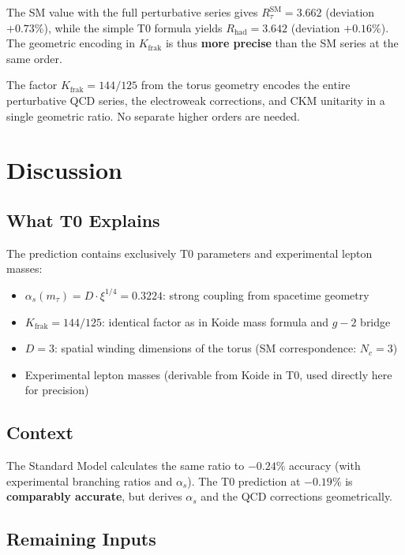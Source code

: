 	The SM value with the full perturbative series gives $R_\tau^\text{SM} = 3.662$ (deviation $+0.73\%$), while the simple T0 formula yields $R_\text{had} = 3.642$ (deviation $+0.16\%$). The geometric encoding in $K_\text{frak}$ is thus \textbf{more precise} than the SM series at the same order.
	
	\begin{keypoint}
		The factor $K_\text{frak} = 144/125$ from the torus geometry encodes the entire perturbative QCD series, the electroweak corrections, and CKM unitarity in a single geometric ratio. No separate higher orders are needed.
	\end{keypoint}
	
	
	\section{Discussion}
	
	\subsection{What T0 Explains}
	
	The prediction contains exclusively T0 parameters and experimental lepton masses:
	\begin{itemize}
		\item $\alpha_s(m_\tau) = D \cdot \xi^{1/4} = 0.3224$: strong coupling from spacetime geometry
		\item $K_\text{frak} = 144/125$: identical factor as in Koide mass formula and $g-2$ bridge
		\item $D = 3$: spatial winding dimensions of the torus (SM correspondence: $N_c=3$)
		\item Experimental lepton masses (derivable from Koide in T0, used directly here for precision)
	\end{itemize}
	
	\subsection{Context}
	
	The Standard Model calculates the same ratio to $-0.24\%$ accuracy (with experimental branching ratios and $\alpha_s$). The T0 prediction at $-0.19\%$ is \textbf{comparably accurate}, but derives $\alpha_s$ and the QCD corrections geometrically.
	
	\subsection{Remaining Inputs}
	
